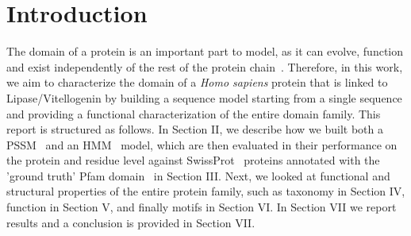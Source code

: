 
\section{Introduction}
\label{sec:introduction}

The domain of a protein is an important part to model, as it can evolve, function and exist independently of the rest of the protein chain~\cite{domain_structure}. Therefore, in this work, we aim to characterize the domain of a \textit{Homo sapiens} protein that is linked to Lipase/Vitellogenin by building a sequence model starting from a single sequence and providing a functional characterization of the entire domain family. This report is structured as follows. In Section II, we describe how we built both a PSSM~\cite{psiblast} and an HMM~\cite{hmmer} model, which are then evaluated in their performance on the protein and residue level against SwissProt~\cite{uniprot} proteins annotated with the 'ground truth' Pfam domain~\cite{pfam} in Section III. Next, we looked at functional and structural properties of the entire protein family, such as taxonomy in Section IV, function in Section V, and finally motifs in Section VI.  In Section VII we report results and a conclusion is provided in Section VII.
